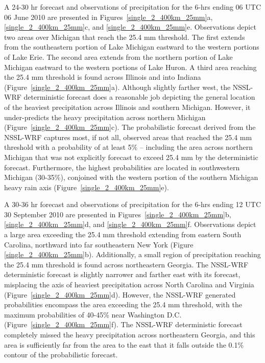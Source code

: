A 24-30 hr forecast and observations of precipitation for the 6-hrs ending 06 UTC 06 June 2010 are presented in \mbox{Figures \ref{single_2_400km_25mm}a}, \mbox{\ref{single_2_400km_25mm}c}, and \mbox{\ref{single_2_400km_25mm}e}.
Observations depict two areas over Michigan that reach the 25.4 mm threshold.
The first extends from the southeastern portion of Lake Michigan eastward to the western portions of Lake Erie.
The second area extends from the northern portion of Lake Michigan eastward to the western portions of Lake Huron.
A third area reaching the 25.4 mm threshold is found across Illinois and into Indiana \mbox{(Figure \ref{single_2_400km_25mm}a)}.
Although slightly farther west, the NSSL-WRF deterministic forecast does a reasonable job depicting the general location of the heaviest precipitation across Illinois and southern Michigan.
However, it under-predicts the heavy precipitation across northern Michigan \mbox{(Figure \ref{single_2_400km_25mm}c)}.
The probabilistic forecast derived from the NSSL-WRF captures most, if not all, observed areas that reached the 25.4 mm threshold with a probability of at least 5\% -- including the area across northern Michigan that was not explicitly forecast to exceed 25.4 mm by the deterministic forecast.
Furthermore, the highest probabilities are located in southwestern Michigan (30-35\%), conjoined with the western portion of the southern Michigan heavy rain axis \mbox{(Figure \ref{single_2_400km_25mm}e)}.


A 30-36 hr forecast and observations of precipitation for the 6-hrs ending 12 UTC 30 September 2010 are presented in \mbox{Figures \ref{single_2_400km_25mm}b}, \mbox{\ref{single_2_400km_25mm}d}, and \mbox{\ref{single_2_400km_25mm}f}.
Observations depict a large area exceeding the 25.4 mm threshold extending from eastern South Carolina, northward into far southeastern New York (Figure \mbox{\ref{single_2_400km_25mm}b)}.
Additionally, a small region of precipitation reaching the 25.4 mm threshold is found across northeastern Georgia.
The NSSL-WRF deterministic forecast is slightly narrower and farther east with its forecast, misplacing the axis of heaviest precipitation across North Carolina and Virginia \mbox{(Figure \ref{single_2_400km_25mm}d)}.
However, the NSSL-WRF generated probabilities encompass the area exceeding the 25.4 mm threshold, with the maximum probabilities of 40-45\% near Washington D.C. \mbox{(Figure \ref{single_2_400km_25mm}f)}.
The NSSL-WRF deterministic forecast completely missed the heavy precipitation across northeastern Georgia, and this area is sufficiently far from the area to the east that it falls outside the 0.1\% contour of the probabilistic forecast.


